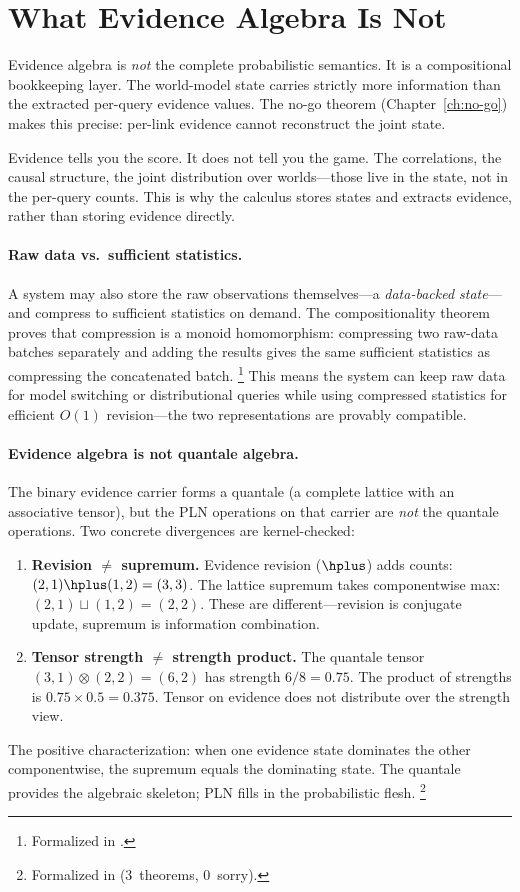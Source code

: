 \documentclass[11pt,openany]{report}
\begin{document}
\section{What Evidence Algebra Is Not}

Evidence algebra is \emph{not} the complete probabilistic semantics.
It is a compositional bookkeeping layer.  The world-model state
carries strictly more information than the extracted per-query evidence
values.  The no-go theorem (Chapter~\ref{ch:no-go}) makes this
precise: per-link evidence cannot reconstruct the joint state.

Evidence tells you the score.  It does not tell you the game.
The correlations, the causal structure, the joint distribution over
worlds---those live in the state, not in the per-query counts.  This
is why the calculus stores states and extracts evidence, rather than
storing evidence directly.

\paragraph{Raw data vs.\ sufficient statistics.}
A system may also store the raw observations themselves---a
\emph{data-backed state}---and compress to sufficient statistics
on demand.  The compositionality theorem
 proves that compression is a monoid
homomorphism: compressing two raw-data batches separately and
adding the results gives the same sufficient statistics as
compressing the concatenated batch.%
\footnote{Formalized in
.}
This means the system can keep raw data for model switching or
distributional queries while using compressed statistics for
efficient $O(1)$ revision---the two representations are provably
compatible.

\paragraph{Evidence algebra is not quantale algebra.}
The binary evidence carrier forms a quantale (a complete lattice
with an associative tensor), but the PLN operations on that
carrier are \emph{not} the quantale operations.  Two concrete
divergences are kernel-checked:
\begin{enumerate}
\item \textbf{Revision $\neq$ supremum.}  Evidence revision
  ($\hplus$) adds counts: $(2,1) \hplus (1,2) = (3,3)$.  The
  lattice supremum takes componentwise max: $(2,1) \sqcup (1,2) =
  (2,2)$.  These are different---revision is conjugate update,
  supremum is information combination.
\item \textbf{Tensor strength $\neq$ strength product.}  The
  quantale tensor $(3,1) \otimes (2,2) = (6,2)$ has strength
  $6/8 = 0.75$.  The product of strengths is $0.75 \times 0.5 =
  0.375$.  Tensor on evidence does not distribute over the
  strength view.
\end{enumerate}
The positive characterization: when one evidence state dominates
the other componentwise, the supremum equals the dominating
state.  The quantale provides the algebraic skeleton; PLN fills
in the probabilistic flesh.%
\footnote{Formalized in
(3~theorems, 0~sorry).}
\end{document}
